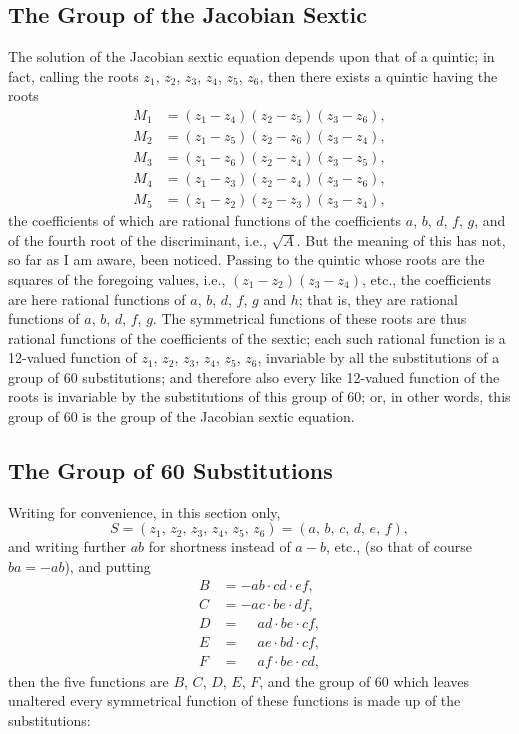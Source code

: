 \documentclass[11pt,a4paper]{book}
\begin{document}
\subsection*{The Group of the Jacobian Sextic}

The solution of the Jacobian sextic equation depends upon that of a quintic; in fact, calling the roots $z_{1}$, $z_{2}$, $z_{3}$, $z_{4}$, $z_{5}$, $z_{6}$, then there exists a quintic having the roots
\begin{align*}
M_{1} &= (z_{1}-z_{4})(z_{2}-z_{5})(z_{3}-z_{6}),\\
M_{2} &= (z_{1}-z_{5})(z_{2}-z_{6})(z_{3}-z_{4}),\\
M_{3} &= (z_{1}-z_{6})(z_{2}-z_{4})(z_{3}-z_{5}),\\
M_{4} &= (z_{1}-z_{3})(z_{2}-z_{4})(z_{3}-z_{6}),\\
M_{5} &= (z_{1}-z_{2})(z_{2}-z_{3})(z_{3}-z_{4}),
\end{align*}
the coefficients of which are rational functions of the coefficients $a$, $b$, $d$, $f$, $g$, and of the fourth root of the discriminant, i.e., $\sqrt{A}$. But the meaning of this has not, so far as I am aware, been noticed. Passing to the quintic whose roots are the squares of the foregoing values, i.e., $(z_{1}-z_{2})(z_{3}-z_{4})$, etc., the coefficients are here rational functions of $a$, $b$, $d$, $f$, $g$ and $h$; that is, they are rational functions of $a$, $b$, $d$, $f$, $g$. The symmetrical functions of these roots are thus rational functions of the coefficients of the sextic; each such rational function is a 12-valued function of $z_{1}$, $z_{2}$, $z_{3}$, $z_{4}$, $z_{5}$, $z_{6}$, invariable by all the substitutions of a group of 60 substitutions; and therefore also every like 12-valued function of the roots is invariable by the substitutions of this group of 60; or, in other words, this group of 60 is the group of the Jacobian sextic equation.

\subsection*{The Group of 60 Substitutions}

Writing for convenience, in this section only,
\[
S = (z_{1},\, z_{2},\, z_{3},\, z_{4},\, z_{5},\, z_{6}) = (a,\, b,\, c,\, d,\, e,\, f),
\]
and writing further $ab$ for shortness instead of $a-b$, etc., (so that of course $ba = -ab$), and putting
\begin{align*}
B &= -ab \cdot cd \cdot ef,\\
C &= -ac \cdot be \cdot df,\\
D &= \phantom{-}ad \cdot be \cdot cf,\\
E &= \phantom{-}ae \cdot bd \cdot cf,\\
F &= \phantom{-}af \cdot be \cdot cd,
\end{align*}
then the five functions are $B$, $C$, $D$, $E$, $F$, and the group of 60 which leaves unaltered every symmetrical function of these functions is made up of the substitutions:
\end{document}

